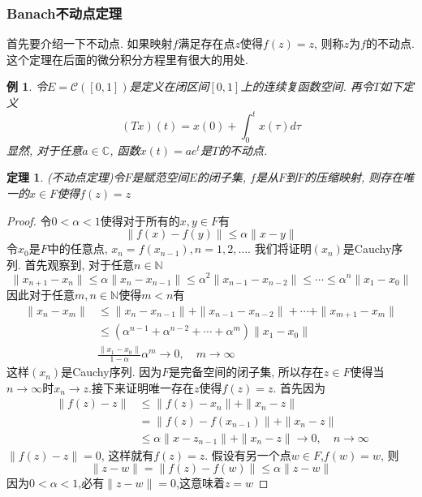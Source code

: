 \documentclass[a4paper,11pt]{article}
\newtheorem{theorem}{\hspace{2em}定理}[section]
\newtheorem{proof}{证明}[section]
\newtheorem{example}{例}[section]
\begin{document}
\subsubsection*{Banach不动点定理}
首先要介绍一下不动点. 如果映射$f$满足存在点$z$使得$f(z)=z$, 则称$z$为$f$的不动点. 这个定理在后面的微分积分方程里有很大的用处.
\begin{example}
  令$E=\mathcal{C}([0,1])$是定义在闭区间$[0,1]$上的连续复函数空间. 再令$T$如下定义
  \begin{equation*}
    (Tx)(t)=x(0)+\int_{0}^{t}x(\tau)d\tau
  \end{equation*}
  显然, 对于任意$a\in \mathbb{C}$, 函数$x(t)=ae^t$是$T$的不动点.
\end{example}
\begin{theorem}
  (不动点定理)令$F$是赋范空间$E$的闭子集, $f$是从$F$到$F$的压缩映射, 则存在唯一的$x\in F$使得$f(z)=z$
\end{theorem}
\begin{proof}
  令$0<\alpha<1$使得对于所有的$x,y\in F$有
  \begin{equation*}
    \|f(x)-f(y)\|\leq\alpha\|x-y\|
  \end{equation*}
  令$x_0$是$F$中的任意点, $x_n=f(x_{n-1}),n=1,2,\dots$. 我们将证明$(x_n)$是Cauchy序列. 首先观察到, 对于任意$n\in \mathbb{N}$
  \begin{equation*}
    \|x_{n+1}-x_n\|\leq\alpha\|x_n-x_{n-1}\|\leq\alpha^2\|x_{n-1}-x_{n-2}\|\leq\cdots\leq\alpha^n\|x_1-x_0\|
  \end{equation*}
  因此对于任意$m,n\in\mathbb{N}$使得$m<n$有
  \begin{equation*}
  \begin{split}
     \|x_n-x_m\| & \leq\|x_n-x_{n-1}\|+\|x_{n-1}-x_{n-2}\|+\cdots+\|x_{m+1}-x_{m}\| \\
       & \leq(\alpha^{n-1}+\alpha^{n-2}+\cdots+\alpha^m)\|x_1-x_0\| \\
       & \frac{\|x_1-x_0\|}{1-\alpha}\alpha^m\to 0,\quad m\to\infty
  \end{split}
  \end{equation*}
  这样$(x_n)$是Cauchy序列. 因为$F$是完备空间的闭子集, 所以存在$z\in F$使得当$n\to\infty$时$x_n\to z$.接下来证明唯一存在$z$使得$f(z)=z$.
  首先因为
  \begin{equation*}\
  \begin{split}
     \|f(z)-z\|&\leq\|f(z)-x_n\|+\|x_n-z\| \\
       &=\|f(z)-f(x_{n-1})\|+\|x_n-z\| \\
       &\leq\alpha\|x-z_{n-1}\|+\|x_n-z\|\to 0,\quad n\to\infty
  \end{split}
  \end{equation*}
  $\|f(z)-z\|=0$, 这样就有$f(z)=z$. 假设有另一个点$w\in F$,$f(w)=w$, 则
  \begin{equation*}
    \|z-w\|=\|f(z)-f(w)\|\leq\alpha\|z-w\|
  \end{equation*}
  因为$0<\alpha<1$,必有$\|z-w\|=0$,这意味着$z=w$
\end{proof}
\end{document}
